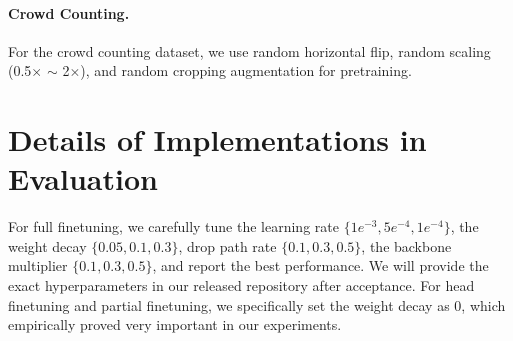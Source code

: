 \documentclass[10pt,twocolumn,letterpaper]{article}
\begin{document}
\paragraph{Crowd Counting.}
For the crowd counting dataset, we use random horizontal flip, random scaling (0.5$\times$ $\sim$ 2$\times$), and random cropping augmentation for pretraining.


\section{Details of Implementations in Evaluation}
For full finetuning, we carefully tune the learning rate $\{1e^{-3}, 5e^{-4}, 1e^{-4}\}$, the weight decay $\{0.05, 0.1, 0.3\}$, drop path rate $\{0.1, 0.3, 0.5\}$, the backbone multiplier $\{0.1, 0.3, 0.5\}$, and report the best performance. We will provide the exact hyperparameters in our released repository after acceptance. For head finetuning and partial finetuning, we specifically set the weight decay as 0, which empirically proved very important in our experiments.
\end{document}
